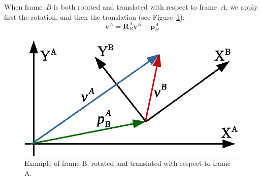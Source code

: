 When frame~$B$ is both rotated and translated with respect to frame~$A$, we apply first the rotation, and then the translation (see Figure~\ref{fig:rotation_translation}):
\begin{equation}
 \mathbf{v}^A = \mathbf{R}^A_B\mathbf{v}^B + \mathbf{p}^A_B
\end{equation}
\begin{figure}[bth!]
  \begin{center}
    \includegraphics[width=1.0\columnwidth]{figures/rotation_translation.eps}
    \caption{Example of frame B, rotated and translated with respect to frame A.}
    \label{fig:rotation_translation}
  \end{center}
\end{figure}



